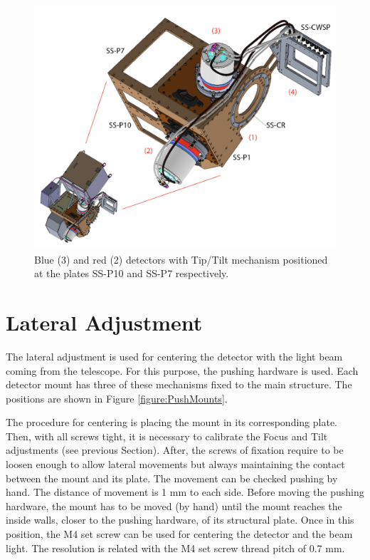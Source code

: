 \documentclass{report}
\begin{document}
\begin{figure}
\centering
\includegraphics[width=1\linewidth]{figures/SSCCDmounts2.png}
\caption{Blue (3) and red (2) detectors with Tip/Tilt mechanism positioned at the plates SS-P10 and SS-P7 respectively.}
\label{figure:SSCCDmounts2}
\end{figure}

\section{Lateral Adjustment}

The lateral adjustment is used for centering the detector with the light beam coming from the telescope. For this purpose, the pushing hardware is used. Each detector mount has three of these mechanisms fixed to the main structure. The positions are shown in Figure \ref{figure:PushMounts}.

The procedure for centering is placing the mount in its corresponding plate. Then, with all screws tight, it is necessary to calibrate the Focus and Tilt adjustments (see previous Section). After, the screws of fixation require to be loosen enough to allow lateral movements but always maintaining the contact between the mount and its plate. The movement can be checked pushing by hand. The distance of movement is 1 mm to each side. Before moving the pushing hardware, the mount has to be moved (by hand) until the mount reaches the inside walls, closer to the pushing hardware, of its structural plate. Once in this position, the M4 set screw can be used for centering the detector and the beam light. The resolution is related with the M4 set screw thread pitch of 0.7 mm.
\end{document}
